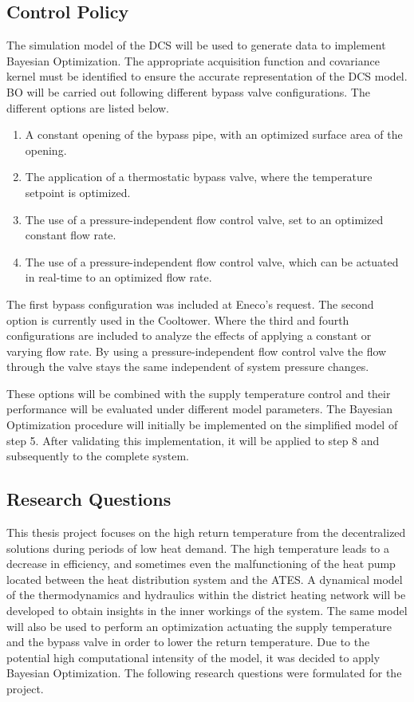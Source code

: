 \subsection{Control Policy}
The simulation model of the DCS will be used to generate data to implement Bayesian Optimization. The appropriate acquisition function and covariance kernel must be identified to ensure the accurate representation of the DCS model. BO will be carried out following different bypass valve configurations. The different options are listed below.

\begin{enumerate} 
    \item A constant opening of the bypass pipe, with an optimized surface area of the opening. 
    \item The application of a thermostatic bypass valve, where the temperature setpoint is optimized.
    \item The use of a pressure-independent flow control valve, set to an optimized constant flow rate. 
    \item The use of a pressure-independent flow control valve, which can be actuated in real-time to an optimized flow rate.
\end{enumerate}

The first bypass configuration was included at Eneco's request.  The second option is currently used in the Cooltower. Where the third and fourth configurations are included to analyze the effects of applying a constant or varying flow rate. By using a pressure-independent flow control valve the flow through the valve stays the same independent of system pressure changes.

These options will be combined with the supply temperature control and their performance will be evaluated under different model parameters. The Bayesian Optimization procedure will initially be implemented on the simplified model of step 5. After validating this implementation, it will be applied to step 8 and subsequently to the complete system. 
 

\newpage
\subsection{Research Questions}
This thesis project focuses on the high return temperature from the decentralized solutions during periods of low heat demand. The high temperature leads to a decrease in efficiency, and sometimes even the malfunctioning of the heat pump located between the heat distribution system and the ATES. A dynamical model of the thermodynamics and hydraulics within the district heating network will be developed to obtain insights in the inner workings of the system. The same model will also be used to perform an optimization actuating the supply temperature and the bypass valve in order to lower the return temperature. Due to the potential high computational intensity of the model, it was decided to apply Bayesian Optimization. The following research questions were formulated for the project.  

